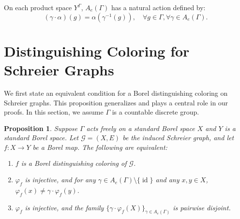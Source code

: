 \documentclass[11pt, reqno, a4paper]{amsart}
\theoremstyle{plain}
\newtheorem{proposition}[theorem]{Proposition}
\theoremstyle{definition}
\theoremstyle{remark}
\newcommand{\id}{\operatorname{id}}
\begin{document}
On each product space $Y^\Gamma$, $A_e(\Gamma)$ has a natural action defined by:
\[ (\gamma \cdot \alpha)(g) = \alpha(\gamma^{-1}(g)), \quad \forall g \in \Gamma, \forall \gamma \in A_e(\Gamma). \]



\section{Distinguishing Coloring for Schreier Graphs}

We first state an equivalent condition for a Borel distinguishing coloring on Schreier graphs. This proposition generalizes \cite[Proposition 5]{BK25} and plays a central role in our proofs. In this section, we assume $\Gamma$ is a countable discrete group.

\begin{proposition}\label{equivalence}
Suppose $\Gamma$ acts freely on a standard Borel space $X$ and $Y$ is a standard Borel space. Let $\mathcal{G}=(X,E)$ be the induced Schreier graph, and let $f: X\longrightarrow Y$ be a Borel map. The following are equivalent:
\begin{enumerate}
    \item $f$ is a Borel distinguishing coloring of $\mathcal{G}$.
    \item $\varphi_f$ is injective, and for any $\gamma \in A_e(\Gamma) \setminus \{\id\}$ and any $x,y\in X$,  $\varphi_f(x) \ne \gamma\cdot\varphi_f(y)$.
    \item $\varphi_f$ is injective, and the family $\{\gamma\cdot \varphi_f(X)\}_{\gamma\in A_e(\Gamma)}$ is pairwise disjoint.
\end{enumerate}
\end{proposition}
\end{document}
